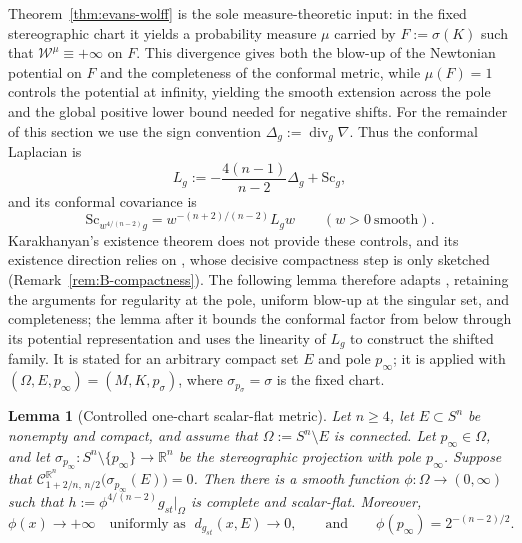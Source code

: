 \documentclass[12pt,oneside,a4paper]{article}
\theoremstyle{mytheorem}
\newtheorem{lemma}[definition]{Lemma}
\theoremstyle{remark}
\theoremstyle{definition}
\begin{document}
Theorem~\ref{thm:evans-wolff} is the sole measure-theoretic input: in the fixed
stereographic chart it yields a probability measure \(\mu\) carried by
\(F:=\sigma(K)\) such that
$\mathcal{W}^\mu\equiv+\infty$ on \(F\).
This divergence gives both the blow-up of the Newtonian potential on
\(F\) and the completeness of the conformal metric, while \(\mu(F)=1\)
controls the potential at infinity, yielding the smooth extension across
the pole and the global positive lower bound needed for negative shifts.
For the remainder of this section we use the sign convention
$\Delta_g:=\operatorname{div}_g\nabla$.  Thus the conformal Laplacian is
\[
 L_g:=-\frac{4(n-1)}{n-2}\Delta_g+\mathrm{Sc}_g,
\]
and its conformal covariance is
\begin{equation}\label{eq:conformal-covariance-metric}
\mathrm{Sc}_{w^{4/(n-2)}g}
=
w^{-(n+2)/(n-2)}L_gw
\qquad (w>0\ \text{smooth}).
\end{equation}
Karakhanyan's existence theorem \cite[Theorem~1.1]{zbMATH07873599} does
not provide these controls, and its existence direction relies on
\cite[Proposition~2.1]{zbMATH07873599}, whose decisive compactness step
is only sketched (Remark~\ref{rem:B-compactness}).  The following lemma
therefore adapts \cite[Theorem~1.1, implication
\textup{(ii)}\(\Rightarrow\)\textup{(i)},
equations~(4.1)--(4.7)]{zbMATH07873599}, retaining the arguments for
regularity at the pole, uniform blow-up at the singular set, and
completeness; the lemma after it bounds the conformal factor from below
through its potential representation and uses the linearity of \(L_g\)
to construct the shifted family.
It is stated for an arbitrary compact set \(E\) and pole \(p_\infty\);
it is applied with \((\Omega,E,p_\infty)=(M,K,p_\sigma)\), where
\(\sigma_{p_\sigma}=\sigma\) is the fixed chart.








\begin{lemma}[Controlled one-chart scalar-flat metric]\label{lem:onechart}
Let $n\ge4$, let $E\subset S^n$ be nonempty and compact, and
assume that $\Omega:=S^n\setminus E$
is connected.  Let $p_\infty\in\Omega$, and let
$\sigma_{p_\infty}:S^n\setminus\{p_\infty\}\to \mathbb{R}^n$ be the
stereographic projection with pole $p_\infty$.  Suppose that
$\mathcal{C}_{1+2/n,\,n/2}^{\mathbb R^n}\bigl(\sigma_{p_\infty}(E)\bigr)=0$.
Then there is a smooth function $\phi:\Omega\to(0,\infty)$ such that
$h:=\phi^{4/(n-2)}g_{st}\big|_\Omega$ is complete and scalar-flat.  Moreover,
\[
 \phi(x)\longrightarrow+\infty
 \quad\text{uniformly as }\;
 d_{g_{st}}(x,E)\longrightarrow0,
 \qquad\text{and}\qquad
 \phi(p_\infty)=2^{-(n-2)/2}.
\]
\end{lemma}
\end{document}
